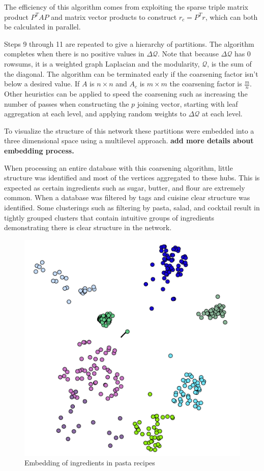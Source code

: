 \documentclass[conference]{IEEEtran}
\begin{document}
The efficiency of this algorithm comes from exploiting the sparse triple matrix
product $P^TAP$ and matrix vector products to construct $r_c = P^Tr$, which can both be calculated
in parallel.

Steps 9 through 11 are
repeated to give a hierarchy of partitions. The algorithm completes when there is no
positive values in $\Delta \mathcal{Q}$. Note that because $\Delta \mathcal{Q}$ has 0 rowsums, 
it is a weighted graph Laplacian and the modularity, $\mathcal{Q}$, is the sum of the diagonal.
The algorithm can be terminated early if the coarsening factor isn't below a desired value.
If $A$ is $n \times n$ and $A_c$ is $m \times m$ the coarsening factor is $\frac{m}{n}$.
Other heuristics can be applied to speed the coarsening such as increasing the number of passes
when constructing the $p$ joining vector, starting with leaf aggregation at each level, and
applying random weights to $\Delta \mathcal{Q}$ at each level.

To visualize the structure of this network these partitions were embedded into a three 
dimensional space using a multilevel approach. \textbf{add more details about embedding
process.}

When processing an entire
database with this coarsening algorithm, little structure was identified and most of the vertices
aggregated to these hubs. This is expected as certain ingredients such as sugar, butter, and
flour are extremely common. When a database was filtered by tags and cuisine clear structure
was identified. Some clusterings such as filtering by pasta, salad, and cocktail result in
tightly grouped clusters that contain intuitive groups of ingredients demonstrating there is
clear structure in the network.

  \begin{figure}[h!]
	\centering
	\includegraphics[width=0.8\linewidth]{pastas.png}
	\caption[Embedding of ingredients in pasta recipes]{Embedding of ingredients in pasta recipes}
	\label{fig:P2compileP0-1}
  \end{figure}
\end{document}
